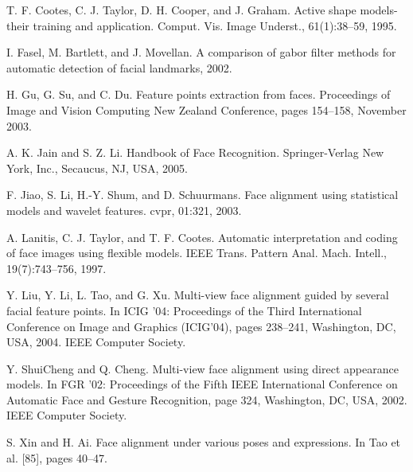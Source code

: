 \documentclass[12pt, twoside]{report}
\begin{document}
\begin{thebibliography}{9}
		T. F. Cootes, C. J. Taylor, D. H. Cooper, and J. Graham. Active shape models-their training and application. Comput. Vis. Image Underst., 61(1):38–59, 1995.
		
		I. Fasel, M. Bartlett, and J. Movellan. A comparison of gabor filter methods for automatic detection of facial landmarks, 2002. 
			
		H. Gu, G. Su, and C. Du. Feature points extraction from faces. Proceedings of Image and Vision Computing New Zealand Conference, pages 154–158, November 2003. 
		
		A. K. Jain and S. Z. Li. Handbook of Face Recognition. Springer-Verlag New York, Inc., Secaucus, NJ, USA, 2005. 
		
		F. Jiao, S. Li, H.-Y. Shum, and D. Schuurmans. Face alignment using statistical models and wavelet features. cvpr, 01:321, 2003.
		
		A. Lanitis, C. J. Taylor, and T. F. Cootes. Automatic interpretation and coding of face images using flexible models. IEEE Trans. Pattern Anal. Mach. Intell., 19(7):743–756, 1997. 
		
		Y. Liu, Y. Li, L. Tao, and G. Xu. Multi-view face alignment guided by several facial feature points. In ICIG ’04: Proceedings of the Third International Conference on Image and Graphics (ICIG’04), pages 238–241, Washington, DC, USA, 2004. IEEE Computer Society. 
			
		Y. ShuiCheng and Q. Cheng. Multi-view face alignment using direct appearance models. In FGR ’02: Proceedings of the Fifth IEEE International Conference on Automatic Face and Gesture Recognition, page 324, Washington, DC, USA, 2002. IEEE Computer Society. 
			
		S. Xin and H. Ai. Face alignment under various poses and expressions. In Tao et al. [85], pages 40–47. 
	\end{thebibliography}
\end{document}
